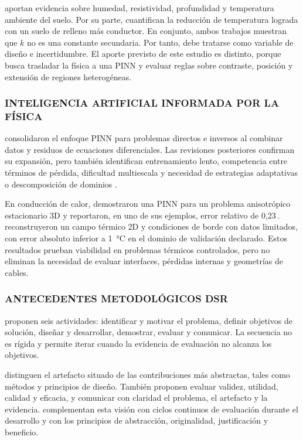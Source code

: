 \textcite[1,6--9]{khumalo2025} aportan evidencia sobre humedad, resistividad, profundidad y temperatura ambiente del suelo. Por su parte, \textcite[1,10,16]{kim2025} cuantifican la reducción de temperatura lograda con un suelo de relleno más conductor. En conjunto, ambos trabajos muestran que $k$ no es una constante secundaria. Por tanto, debe tratarse como variable de diseño e incertidumbre. El aporte previsto de este estudio es distinto, porque busca trasladar la física a una PINN y evaluar reglas sobre contraste, posición y extensión de regiones heterogéneas.

\subsubsection{INTELIGENCIA ARTIFICIAL INFORMADA POR LA FÍSICA}

\textcite[686--690]{raissi2019} consolidaron el enfoque PINN para problemas directos e inversos al combinar datos y residuos de ecuaciones diferenciales. Las revisiones posteriores confirman su expansión, pero también identifican entrenamiento lento, competencia entre términos de pérdida, dificultad multiescala y necesidad de estrategias adaptativas o descomposición de dominios \parencites[1--2,14--17]{lawal2022}[2--6]{ren2025}.

En conducción de calor, \textcite[1,3,17]{xing2023} demostraron una PINN para un problema anisotrópico estacionario 3D y reportaron, en uno de sus ejemplos, error relativo de 0,23\,\pct. \textcite[1,3,16]{pan2025} reconstruyeron un campo térmico 2D y condiciones de borde con datos limitados, con error absoluto inferior a \SI{1}{\celsius} en el dominio de validación declarado. Estos resultados prueban viabilidad en problemas térmicos controlados, pero no eliminan la necesidad de evaluar interfaces, pérdidas internas y geometrías de cables.

\subsubsection{ANTECEDENTES METODOLÓGICOS DSR}

\textcite[54--56]{peffers2007} proponen seis actividades: identificar y motivar el problema, definir objetivos de solución, diseñar y desarrollar, demostrar, evaluar y comunicar. La secuencia no es rígida y permite iterar cuando la evidencia de evaluación no alcanza los objetivos.

\textcite[342--350]{gregor2013} distinguen el artefacto situado de las contribuciones más abstractas, tales como métodos y principios de diseño. También proponen evaluar validez, utilidad, calidad y eficacia, y comunicar con claridad el problema, el artefacto y la evidencia. \textcite[198--203]{delport2024} complementan esta visión con ciclos continuos de evaluación durante el desarrollo y con los principios de abstracción, originalidad, justificación y beneficio.

